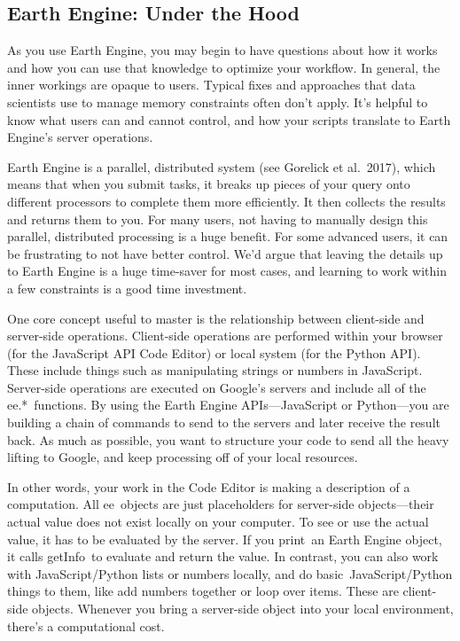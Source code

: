\documentclass[
  letterpaper,
  DIV=11,
  numbers=noendperiod]{scrreprt}
\begin{document}
\hypertarget{earth-engine-under-the-hood}{%
\subsection{Earth Engine: Under the
Hood}\label{earth-engine-under-the-hood}}

As you use Earth Engine, you may begin to have questions about how it
works and how you can use that knowledge to optimize your workflow. In
general, the inner workings are opaque to users. Typical fixes and
approaches that data scientists use to manage memory constraints often
don't apply. It's helpful to know what users can and cannot control, and
how your scripts translate to Earth Engine's server operations.

Earth Engine is a parallel, distributed system (see Gorelick et
al.~2017), which means that when you submit tasks, it breaks up pieces
of your query onto different processors to complete them more
efficiently. It then collects the results and returns them to you. For
many users, not having to manually design this parallel, distributed
processing is a huge benefit. For some advanced users, it can be
frustrating to not have better control. We'd argue that leaving the
details up to Earth Engine is a huge time-saver for most cases, and
learning to work within a few constraints is a good time investment.

One core concept useful to master is the relationship between
client-side and server-side operations. Client-side operations are
performed within your browser (for the JavaScript API Code Editor) or
local system (for the Python API). These include things such as
manipulating strings or numbers in JavaScript. Server-side operations
are executed on Google's servers and include all of the ee.*~functions.
By using the Earth Engine APIs---JavaScript or Python---you are building
a chain of commands to send to the servers and later receive the result
back. As much as possible, you want to structure your code to send all
the heavy lifting to Google, and keep processing off of your local
resources.

In other words, your work in the Code Editor is making a description of
a computation. All ee~objects are just placeholders for server-side
objects---their actual value does not exist locally on your computer. To
see or use the actual value, it has to be evaluated by the server. If
you print~an Earth Engine object, it calls getInfo~to evaluate and
return the value. In contrast, you can also work with JavaScript/Python
lists or numbers locally, and do basic~JavaScript/Python things to them,
like add numbers together or loop over items. These are client-side
objects. Whenever you bring a server-side object into your local
environment, there's a computational cost.
\end{document}
